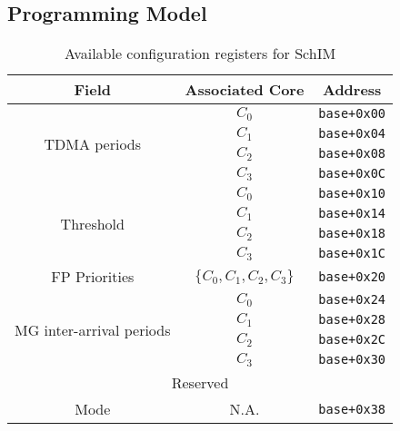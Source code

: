 \subsection{Programming Model}
\begin{table}[!ht]
  \centering
  \caption{Available configuration registers for SchIM}
  \label{tab:configuration_port_structure}
  \begin{tabular}{|c||c|c|}
    \hline
    \multicolumn{1}{|c||}{Field}               & \multicolumn{1}{c|}{Associated Core}      & \multicolumn{1}{c|}{Address}        \\ \hline\hline
    \multirow{4}{*}{TDMA periods}             & $C_{0}$                                   & \verb|base+0x00|                    \\ \cline{2-3} 
    & $C_{1}$                                   & \verb|base+0x04|                    \\ \cline{2-3} 
    & $C_{2}$                                   & \verb|base+0x08|                    \\ \cline{2-3} 
    & $C_{3}$                                   & \verb|base+0x0C|                    \\ \hline
    \multirow{4}{*}{Threshold}                & $C_{0}$                                   & \verb|base+0x10|                    \\ \cline{2-3} 
    & $C_{1}$                                   & \verb|base+0x14|                    \\ \cline{2-3} 
    & $C_{2}$                                   & \verb|base+0x18|                    \\ \cline{2-3} 
    & $C_{3}$                                   & \verb|base+0x1C|                    \\ \hline
    FP Priorities                                & $\{C_{0}, C_{1}, C_{2}, C_{3}\}$          & \verb|base+0x20|                    \\ \hline
    \multirow{4}{*}{MG inter-arrival periods} & $C_{0}$                                   & \verb|base+0x24|                    \\ \cline{2-3} 
    & $C_{1}$                                   & \verb|base+0x28|                    \\ \cline{2-3} 
    & $C_{2}$                                   & \verb|base+0x2C|                    \\ \cline{2-3} 
    & $C_{3}$                                   & \verb|base+0x30|                    \\ \hline
    \multicolumn{3}{|c|}{Reserved}                                                                                              \\ \hline
    Mode                                      & N.A.                                      & \verb|base+0x38|                    \\ \hline
  \end{tabular}
\end{table}

